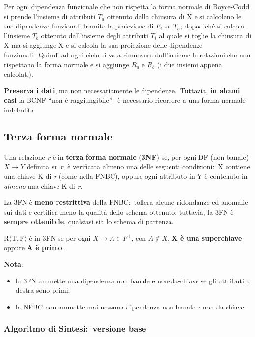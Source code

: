\noindent Per ogni dipendenza funzionale che non rispetta la forma normale di Boyce-Codd si prende l'insieme di attributi $T_a$ ottenuto dalla chiusura di X e si calcolano le sue dipendenze funzionali tramite la proiezione di $F_i$ su $T_a$; dopodiché si calcola l'insieme $T_b$ ottenuto dall'insieme degli attributi $T_i$ al quale si toglie la chiusura di X ma si aggiunge X e si calcola la sua proiezione delle dipendenze funzionali.\
Quindi ad ogni ciclo si va a rimuovere dall'insieme le relazioni che non rispettano la forma normale e si aggiunge $R_a$ e $R_b$ (i due insiemi appena calcolati).\

\textbf{Preserva i dati}, ma non necessariamente le dipendenze.\
Tuttavia, \textbf{in alcuni casi} la BCNF ``non è raggiungibile'':\ è necessario ricorrere a una forma normale indebolita.

\subsection{Terza forma normale}

Una relazione \textit{r} è in \textbf{terza forma normale} (\textbf{3NF}) se, per ogni DF (non banale) $X \rightarrow Y$ definita su \textit{r}, è verificata almeno una delle seguenti condizioni:\ X contiene una chiave K di \textit{r} (come nella FNBC), oppure ogni attributo in Y è contenuto in \textit{almeno} una chiave K di \textit{r}.

La 3FN è \textbf{meno restrittiva} della FNBC:\ tollera alcune ridondanze ed anomalie sui dati e certifica meno la qualità dello schema ottenuto; tuttavia, la 3FN è \textbf{sempre ottenibile}, qualsiasi sia lo schema di partenza.

\begin{theorem}
	$\mathrm{R\langle T,F \rangle}$ è in 3FN se per ogni $X\rightarrow A \in F^+$, con $A \not\in X$, \textbf{X è una superchiave} oppure \textbf{A è primo}.
\end{theorem}

\noindent \textbf{Nota}:\
\begin{itemize}
	\item la 3FN ammette una dipendenza non banale e non-da-chiave se gli attributi a destra sono primi;
	\item la NFBC non ammette mai nessuna dipendenza non banale e non-da-chiave.
\end{itemize}

\subsubsection{Algoritmo di Sintesi:\ versione base}

